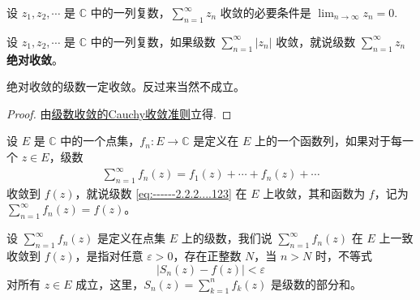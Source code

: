 \documentclass[../../main.tex]{subfiles}%
\begin{document}
\begin{corollary}\label{corollary:复幂级数收敛必要条件}
设 \( z_1, z_2, \cdots \) 是 \( \mathbb{C} \) 中的一列复数，\( \sum_{n=1}^{\infty} z_n \) 收敛的必要条件是 \( \lim_{n \to \infty} z_n = 0 \).
\end{corollary}

\begin{definition}
设 \( z_1, z_2, \cdots \) 是 \( \mathbb{C} \) 中的一列复数，如果级数 \( \sum_{n=1}^{\infty} |z_n| \) 收敛，就说级数 \( \sum_{n=1}^{\infty} z_n \) \textbf{绝对收敛}。
\end{definition}

\begin{proposition}
绝对收敛的级数一定收敛。反过来当然不成立。
\end{proposition}
\begin{proof}
由\hyperref[theorem:复数域的Cauchy收敛准则]{级数收敛的Cauchy收敛准则}立得.
\end{proof}

\begin{definition}
设 \( E \) 是 \( \mathbb{C} \) 中的一个点集，\( f_n: E \to \mathbb{C} \) 是定义在 \( E \) 上的一个函数列，如果对于每一个 \( z \in E \)，级数
\begin{align}
\sum_{n=1}^{\infty} f_n(z) = f_1(z) + \cdots + f_n(z) + \cdots\label{eq:------2.2.2....123}
\end{align}
收敛到 \( f(z) \)，就说级数 \eqref{eq:------2.2.2....123} 在 \( E \) 上收敛，其和函数为 \( f \)，记为 \( \sum_{n=1}^{\infty} f_n(z) = f(z) \)。
\end{definition}

\begin{definition}
设 \( \sum_{n=1}^{\infty} f_n(z) \) 是定义在点集 \( E \) 上的级数，我们说 \( \sum_{n=1}^{\infty} f_n(z) \) 在 \( E \) 上一致收敛到 \( f(z) \)，是指对任意 \( \varepsilon > 0 \)，存在正整数 \( N \)，当 \( n > N \) 时，不等式
\[
|S_n(z) - f(z)| < \varepsilon
\]
对所有 \( z \in E \) 成立，这里，\( S_n(z) = \sum_{k=1}^{n} f_k(z) \) 是级数的部分和。
\end{definition}
\end{document}
